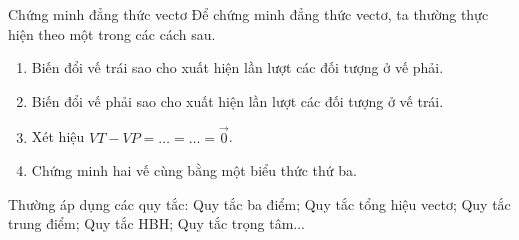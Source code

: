 \begin{dang}{Chứng minh đẳng thức vectơ}
	Để chứng minh đẳng thức vectơ, ta thường thực hiện theo một trong các cách sau.
	\begin{enumerate}
		\item Biến đổi vế trái sao cho xuất hiện lần lượt các đối tượng ở vế phải.
		\item Biến đổi vế phải sao cho xuất hiện lần lượt các đối tượng ở vế trái.
		\item Xét hiệu $VT-VP=\ldots =\ldots = \overrightarrow{0}$.
		\item Chứng minh hai vế cùng bằng một biểu thức thứ ba.
	\end{enumerate}
	Thường áp dụng các quy tắc: Quy tắc ba điểm; Quy tắc tổng hiệu vectơ; Quy tắc trung điểm; Quy tắc HBH; Quy tắc trọng tâm...
\end{dang}
